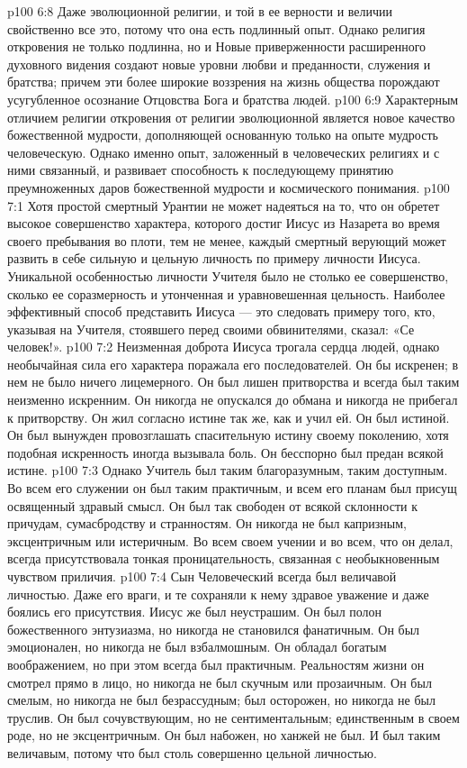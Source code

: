 \vs p100 6:8 \pc Даже эволюционной религии, и той в ее верности и величии свойственно все это, потому что она есть подлинный опыт. Однако религия откровения не только подлинна, но и  Новые приверженности расширенного духовного видения создают новые уровни любви и преданности, служения и братства; причем эти более широкие воззрения на жизнь общества порождают усугубленное осознание Отцовства Бога и братства людей.
\vs p100 6:9 Характерным отличием религии откровения от религии эволюционной является новое качество божественной мудрости, дополняющей основанную только на опыте мудрость человеческую. Однако именно опыт, заложенный в человеческих религиях и с ними связанный, и развивает способность к последующему принятию преумноженных даров божественной мудрости и космического понимания.
\vs p100 7:1 Хотя простой смертный Урантии не может надеяться на то, что он обретет высокое совершенство характера, которого достиг Иисус из Назарета во время своего пребывания во плоти, тем не менее, каждый смертный верующий может развить в себе сильную и цельную личность по примеру личности Иисуса. Уникальной особенностью личности Учителя было не столько ее совершенство, сколько ее соразмерность и утонченная и уравновешенная цельность. Наиболее эффективный способ представить Иисуса --- это следовать примеру того, кто, указывая на Учителя, стоявшего перед своими обвинителями, сказал: «Се человек!».
\vs p100 7:2 Неизменная доброта Иисуса трогала сердца людей, однако необычайная сила его характера поражала его последователей. Он бы искренен; в нем не было ничего лицемерного. Он был лишен притворства и всегда был таким неизменно искренним. Он никогда не опускался до обмана и никогда не прибегал к притворству. Он жил согласно истине так же, как и учил ей. Он был истиной. Он был вынужден провозглашать спасительную истину своему поколению, хотя подобная искренность иногда вызывала боль. Он бесспорно был предан всякой истине.
\vs p100 7:3 Однако Учитель был таким благоразумным, таким доступным. Во всем его служении он был таким практичным, и всем его планам был присущ освященный здравый смысл. Он был так свободен от всякой склонности к причудам, сумасбродству и странностям. Он никогда не был капризным, эксцентричным или истеричным. Во всем своем учении и во всем, что он делал, всегда присутствовала тонкая проницательность, связанная с необыкновенным чувством приличия.
\vs p100 7:4 Сын Человеческий всегда был величавой личностью. Даже его враги, и те сохраняли к нему здравое уважение и даже боялись его присутствия. Иисус же был неустрашим. Он был полон божественного энтузиазма, но никогда не становился фанатичным. Он был эмоционален, но никогда не был взбалмошным. Он обладал богатым воображением, но при этом всегда был практичным. Реальностям жизни он смотрел прямо в лицо, но никогда не был скучным или прозаичным. Он был смелым, но никогда не был безрассудным; был осторожен, но никогда не был труслив. Он был сочувствующим, но не сентиментальным; единственным в своем роде, но не эксцентричным. Он был набожен, но ханжей не был. И был таким величавым, потому что был столь совершенно цельной личностью.
